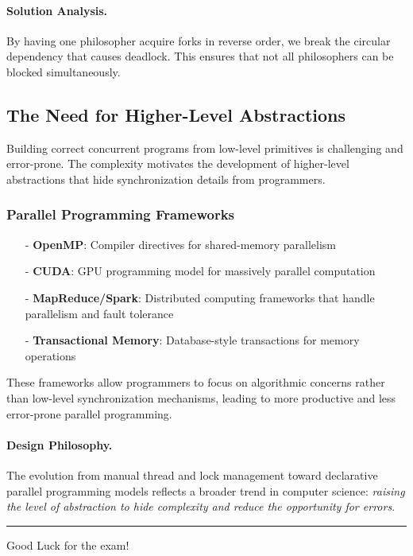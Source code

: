 \documentclass[../../compsys.tex]{subfiles}
\begin{document}
\paragraph{Solution Analysis.} By having one philosopher acquire forks in reverse order, we break the circular dependency that causes deadlock. This ensures that not all philosophers can be blocked simultaneously.
\newpage
\subsection{The Need for Higher-Level Abstractions}
Building correct concurrent programs from low-level primitives is challenging and error-prone. The complexity motivates the development of higher-level abstractions that hide synchronization details from programmers.

\subsubsection{Parallel Programming Frameworks}
\begin{itemize}
  \item[-] \textbf{OpenMP}: Compiler directives for shared-memory parallelism
  \item[-] \textbf{CUDA}: GPU programming model for massively parallel computation
  \item[-] \textbf{MapReduce/Spark}: Distributed computing frameworks that handle parallelism and fault tolerance
  \item[-] \textbf{Transactional Memory}: Database-style transactions for memory operations
\end{itemize}

These frameworks allow programmers to focus on algorithmic concerns rather than low-level synchronization mechanisms, leading to more productive and less error-prone parallel programming.

\paragraph{Design Philosophy.} The evolution from manual thread and lock management toward declarative parallel programming models reflects a broader trend in computer science: \textit{raising the level of abstraction to hide complexity and reduce the opportunity for errors}.\\[10px]
\hrule
\vspace{10px}
Good Luck for the exam! 
\end{document}
